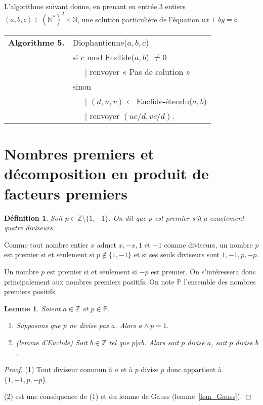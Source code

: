 \documentclass[12pt]{report}
\newtheorem{Def}[thm]{Définition}
\newtheorem{Lem}[thm]{Lemme}
\newcommand{\Z}{\mathbb{Z}}
\begin{document}
L'algorithme suivant donne, en prenant en entrée 3 entiers $(a,b,c)\in (\mathbb{N}^*)^2 \times \mathbb{N}$, une solution particulière de l'équation $ax+by=c$.

\begin{tabular}{ll}
\textbf{Algorithme 5.} & Diophantienne($a,b,c$)\\
& si $c$ mod Euclide($a,b$) $\neq 0 $ \\
& \ \ \ {\rm |} renvoyer « Pas de solution »  \\
& sinon \\
& \ \ \ {\rm | }  $(d,u,v)  \leftarrow $Euclide-étendu($a,b$) \\
& \ \ \ {\rm |} renvoyer $(uc/d,vc/d)$. 
\end{tabular}



\section{Nombres premiers et décomposition en produit de facteurs premiers}

\begin{Def}
Soit $p\in \Z\setminus \{1,-1\}$. On dit que $p$ est premier s'il a exactement quatre diviseurs. 
\end{Def}

Comme tout nombre entier $x$ admet $x,-x, 1$ et $-1$ comme diviseurs, un nombre $p$ est premier si et seulement si $p\notin \{1,-1\}$ et si ses seuls diviseurs sont $1,-1,p,-p$.

Un nombre $p$ est premier si et seulement si $-p$ est premier. On s'intéressera donc principalement aux nombres premiers positifs. On note $\mathbb{P}$ l'ensemble des nombres premiers positifs.
 
\begin{Lem}\label{lem_Euclide}
Soient $a\in \Z$ et $p\in \mathbb{P}$. \begin{enumerate}
\item Supposons que $p$ ne divise pas $a$. Alors $a\wedge p=1$.

\item (lemme d'Euclide) Soit $b\in \Z$ tel que $p|ab$. Alors soit $p$ divise $a$, soit $p$ divise $b$.
\end{enumerate} 

\end{Lem}

\begin{proof}
(1) Tout diviseur commun à $a$ et à $p$ divise $p$ donc appartient à $\{1,-1,p,-p\}$.  

(2) est une conséquence de (1) et du lemme de Gauss (lemme~\ref{lem_Gauss}).
\end{proof}
\end{document}
